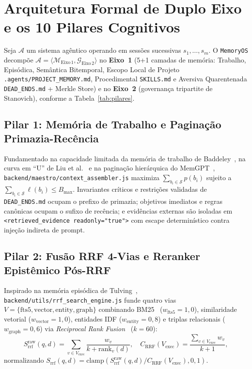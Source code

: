 \documentclass[10pt,twocolumn]{article}
\begin{document}
\section{Arquitetura Formal de Duplo Eixo e os 10 Pilares Cognitivos}

Seja $\mathcal{A}$ um sistema ag\^entico operando em sess\~oes sucessivas $s_1, \dots, s_m$. O \texttt{MemoryOS} decomp\~oe $\mathcal{A} = \langle \mathcal{M}_{\mathrm{Eixo\,1}}, \mathcal{G}_{\mathrm{Eixo\,2}} \rangle$ no \textbf{Eixo~1} (5+1 camadas de mem\'oria: Trabalho, Epis\'odica, Sem\^antica Bitemporal, Escopo Local de Projeto \texttt{.agents/PROJECT\_MEMORY.md}, Procedimental \texttt{SKILLS.md} e Aversiva Quarentenada \texttt{DEAD\_ENDS.md} + Merkle Store) e no \textbf{Eixo~2} (governan\c{c}a tripartite de Stanovich), conforme a Tabela~\ref{tab:pilares}.

\subsection{Pilar 1: Mem\'oria de Trabalho e Pagina\c{c}\~ao Primazia-Rec\^encia}
Fundamentado na capacidade limitada da mem\'oria de trabalho de Baddeley~\cite{E01,E02}, na curva em ``U'' de Liu et al.~\cite{E03} e na pagina\c{c}\~ao hier\'arquica do MemGPT~\cite{E04}, \texttt{backend/maestro/context\_assembler.js} maximiza $\sum_{b_i \in \mathcal{S}} p(b_i)$ sujeito a $\sum_{b_i \in \mathcal{S}} \ell(b_i) \le B_{\max}$. Invariantes cr\'iticos e restri\c{c}\~oes validadas de \texttt{DEAD\_ENDS.md} ocupam o prefixo de primazia; objetivos imediatos e regras can\^onicas ocupam o sufixo de rec\^encia; e evid\^encias externas s\~ao isoladas em \texttt{<retrieved\_evidence readonly="true">} com escape determin\'istico contra inje\c{c}\~ao indireta de prompt.

\subsection{Pilar 2: Fus\~ao RRF 4-Vias e Reranker Epist\^emico P\'os-RRF}
Inspirado na mem\'oria epis\'odica de Tulving~\cite{E05}, \texttt{backend/utils/rrf\_search\_engine.js} funde quatro vias $V = \{\text{fts5}, \text{vector}, \text{entity}, \text{graph}\}$ combinando BM25~\cite{E06} ($w_{\text{fts5}}=1{,}0$), similaridade vetorial ($w_{\text{vector}}=1{,}0$), entidades IDF ($w_{\text{entity}}=0{,}8$) e triplas relacionais ($w_{\text{graph}}=0{,}6$) via \emph{Reciprocal Rank Fusion}~\cite{E07} ($k = 60$):
\begin{equation}
S_{\mathrm{rrf}}^{\mathrm{raw}}(q,d) = \sum_{v \in V_{\mathrm{exec}}} \frac{w_v}{k + \mathrm{rank}_v(d)}, \quad
C_{\mathrm{RRF}}(V_{\mathrm{exec}}) = \frac{\sum_{v \in V_{\mathrm{exec}}} w_v}{k + 1},
\end{equation}
normalizando $S_{\mathrm{rrf}}(q,d) = \mathrm{clamp}(S_{\mathrm{rrf}}^{\mathrm{raw}}(q,d) / C_{\mathrm{RRF}}(V_{\mathrm{exec}}), 0, 1)$.
\end{document}
